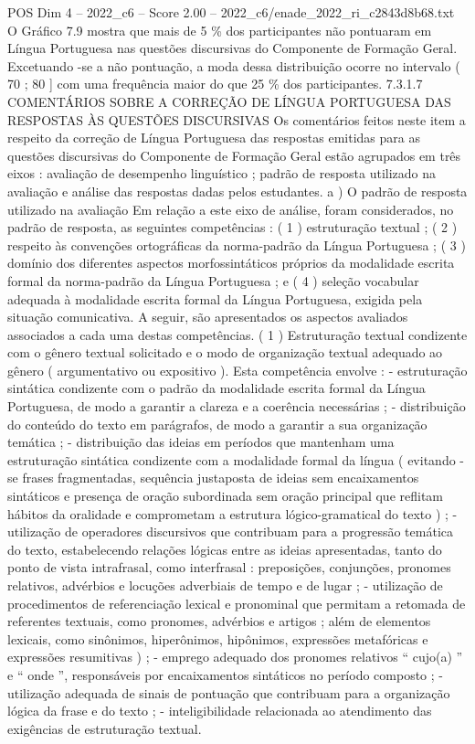 \begin{textsample}{POS Dim 4 – 2022\_c6 – Score 2.00 – 2022\_c6/enade\_2022\_ri\_c2843d8b68.txt}
O Gráfico 7.9 mostra que mais de 5 \% dos participantes não pontuaram em Língua Portuguesa nas questões discursivas do Componente de Formação Geral.
Excetuando -se a não pontuação, a moda dessa distribuição ocorre no intervalo ( 70 ; 80 ] com uma frequência maior do que 25 \% dos participantes. 7.3.1.7 COMENTÁRIOS SOBRE A CORREÇÃO DE LÍNGUA PORTUGUESA DAS RESPOSTAS ÀS QUESTÕES DISCURSIVAS Os comentários feitos neste item a respeito da correção de Língua Portuguesa das respostas emitidas para as questões discursivas do Componente de Formação Geral estão agrupados em três eixos : avaliação de desempenho linguístico ; padrão de resposta utilizado na avaliação e análise das respostas dadas pelos estudantes. a ) O padrão de resposta utilizado na avaliação Em relação a este eixo de análise, foram considerados, no padrão de resposta, as seguintes competências : ( 1 ) estruturação textual ; ( 2 ) respeito às convenções ortográficas da norma-padrão da Língua Portuguesa ; ( 3 ) domínio dos diferentes aspectos morfossintáticos próprios da modalidade escrita formal da norma-padrão da Língua Portuguesa ; e ( 4 ) seleção vocabular adequada à modalidade escrita formal da Língua Portuguesa, exigida pela situação comunicativa.
A seguir, são apresentados os aspectos avaliados associados a cada uma destas competências. ( 1 ) Estruturação textual condizente com o gênero textual solicitado e o modo de organização textual adequado ao gênero ( argumentativo ou expositivo ).
Esta competência envolve : - estruturação sintática condizente com o padrão da modalidade escrita formal da Língua Portuguesa, de modo a garantir a clareza e a coerência necessárias ; - distribuição do conteúdo do texto em parágrafos, de modo a garantir a sua organização temática ; - distribuição das ideias em períodos que mantenham uma estruturação sintática condizente com a modalidade formal da língua ( evitando -se frases fragmentadas, sequência justaposta de ideias sem encaixamentos sintáticos e presença de oração subordinada sem oração principal que reflitam hábitos da oralidade e comprometam a estrutura lógico-gramatical do texto ) ; - utilização de operadores discursivos que contribuam para a progressão temática do texto, estabelecendo relações lógicas entre as ideias apresentadas, tanto do ponto de vista intrafrasal, como interfrasal : preposições, conjunções, pronomes relativos, advérbios e locuções adverbiais de tempo e de lugar ; - utilização de procedimentos de referenciação lexical e pronominal que permitam a retomada de referentes textuais, como pronomes, advérbios e artigos ; além de elementos lexicais, como sinônimos, hiperônimos, hipônimos, expressões metafóricas e expressões resumitivas ) ; - emprego adequado dos pronomes relativos “ cujo(a) ” e “ onde ”, responsáveis por encaixamentos sintáticos no período composto ; - utilização adequada de sinais de pontuação que contribuam para a organização lógica da frase e do texto ; - inteligibilidade relacionada ao atendimento das exigências de estruturação textual.

\end{textsample}
